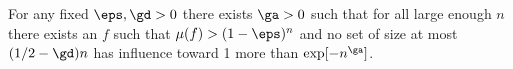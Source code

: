 \begin{thm}\label{prop2}
For any fixed $\eps, \gd>0$
%
there exists $\ga > 0$ such that for all large enough $n$
%
there exists an $f$ %
%
such that
$\mu(f) > (1-\eps)^n$ and no set of %
%
size at most $(1/2-\gd)n$   %
%
has influence
%
toward   %
1 more than $\exp[-n^\ga]$.
\end{thm}